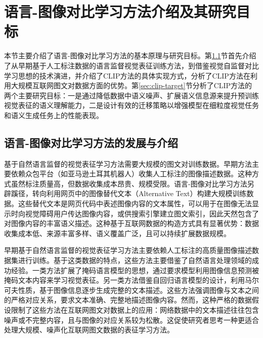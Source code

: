 \section{语言-图像对比学习方法介绍及其研究目标}
本节主要介绍了语言-图像对比学习方法的基本原理与研究目标。第\ref{sec:clip-introduce}节首先介绍了从早期基于人工标注数据的语言监督视觉表征训练方法，到借鉴视觉自监督对比学习思想的技术演进，并介绍了CLIP方法的具体实现方式，分析了CLIP方法在利用大规模互联网图文对数据方面的优势。第\ref{sec:clip-target}节分析了CLIP方法的两个主要研究目标：一是通过降低数据中语义噪声、扩展语义信息源来提升预训练视觉表征的语义理解能力，二是设计有效的迁移策略以增强模型在细粒度视觉任务和语义生成任务上的性能表现。

\subsection{语言-图像对比学习方法的发展与介绍}
\label{sec:clip-introduce}
基于自然语言监督的视觉表征学习方法需要大规模的图文对训练数据。早期方法主要依赖众包平台（如亚马逊土耳其机器人\cite{AMT}）收集人工标注的图像描述数据\cite{young2014flickr, chen2015microsoft}。这种方式虽然标注质量高，但数据收集成本昂贵、规模受限。语言-图像对比学习方法另辟蹊径，转向利用网页中的图像替代文本（Alternative Text）构建大规模训练数据\cite{YFCC100M, sharma-etal-2018-conceptual, changpinyo2021conceptual}。这些替代文本是网页代码中表述图像内容的文本属性，可以用于在图像无法显示时向视觉障碍用户传达图像内容，或供搜索引擎建立图文索引，因此天然包含了对图像内容的丰富语义描述。这种基于互联网数据的构造方式具有显著优势：数据收集成本低、来源丰富多样、语义覆盖广泛，且可以持续扩展数据规模。

早期基于自然语言监督的视觉表征学习方法主要依赖人工标注的高质量图像描述数据集\cite{young2014flickr, chen2015microsoft}进行训练。基于这类数据的特点，这些方法主要借鉴了自然语言处理领域的成功经验。一类方法扩展了掩码语言模型\cite{BERT}的思想，通过要求模型利用图像信息预测被掩码文本内容来学习视觉表征\cite{sariyildiz2020learning}。另一类方法借鉴自回归语言模型\cite{gpt2}的设计，利用马尔可夫性质，基于图像信息逐步生成完整的文本描述\cite{desai2021virtex}。这些方法强调图像与文本之间的严格对应关系，要求文本准确、完整地描述图像内容。然而，这种严格的数据假设限制了这些方法在互联网图文对数据上的应用：网络数据中的文本描述往往包含噪声或不完整内容，且与图像的对应关系较为松散。这促使研究者思考一种更适合处理大规模、噪声化互联网图文数据的表征学习方法。

